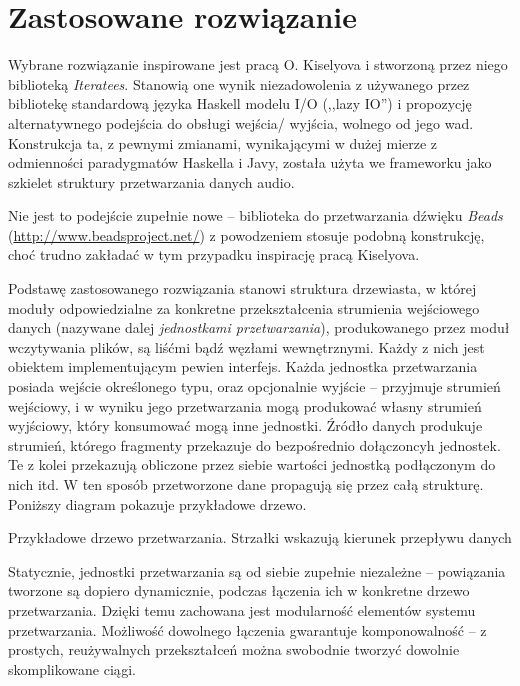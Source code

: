 \section{Zastosowane rozwiązanie}

Wybrane rozwiązanie inspirowane jest pracą O. Kiselyova i stworzoną przez niego biblioteką
\emph{Iteratees}. Stanowią one wynik niezadowolenia z używanego przez bibliotekę standardową języka
Haskell modelu I/O (,,lazy IO'') i propozycję alternatywnego podejścia do obsługi wejścia\slash
wyjścia, wolnego od jego wad. Konstrukcja ta, z pewnymi zmianami, wynikającymi w dużej mierze z
odmienności paradygmatów Haskella i Javy, została użyta we frameworku jako szkielet struktury
przetwarzania danych audio.

\begin{Note}
  Nie jest to podejście zupełnie nowe -- biblioteka do przetwarzania dźwięku \emph{Beads}
  (\url{http://www.beadsproject.net/}) z powodzeniem stosuje podobną konstrukcję, choć trudno
  zakładać w tym przypadku inspirację pracą Kiselyova.
\end{Note}

Podstawę zastosowanego rozwiązania stanowi struktura drzewiasta, w której moduły odpowiedzialne za
konkretne przekształcenia strumienia wejściowego danych (nazywane dalej \emph{jednostkami
przetwarzania}), produkowanego przez moduł wczytywania plików, są liśćmi bądź węzłami wewnętrznymi.
Każdy z nich jest obiektem implementującym pewien interfejs.  Każda jednostka przetwarzania posiada
wejście określonego typu, oraz opcjonalnie wyjście -- przyjmuje strumień wejściowy, i w wyniku jego
przetwarzania mogą produkować własny strumień wyjściowy, który konsumować mogą inne jednostki.
Źródło danych produkuje strumień, którego fragmenty przekazuje do bezpośrednio dołączoncyh
jednostek. Te z kolei przekazują obliczone przez siebie wartości jednostką podłączonym do nich itd.
W ten sposób przetworzone dane propagują się przez całą strukturę. Poniższy diagram pokazuje
przykładowe drzewo.


{Przykładowe drzewo przetwarzania. Strzałki wskazują kierunek przepływu danych}


Statycznie, jednostki przetwarzania są od siebie zupełnie niezależne -- powiązania tworzone są
dopiero dynamicznie, podczas łączenia ich w konkretne drzewo przetwarzania. Dzięki temu zachowana
jest modularność elementów systemu przetwarzania. Możliwość dowolnego łączenia gwarantuje
komponowalność -- z prostych, reużywalnych przekształceń można swobodnie tworzyć dowolnie
skomplikowane ciągi.

